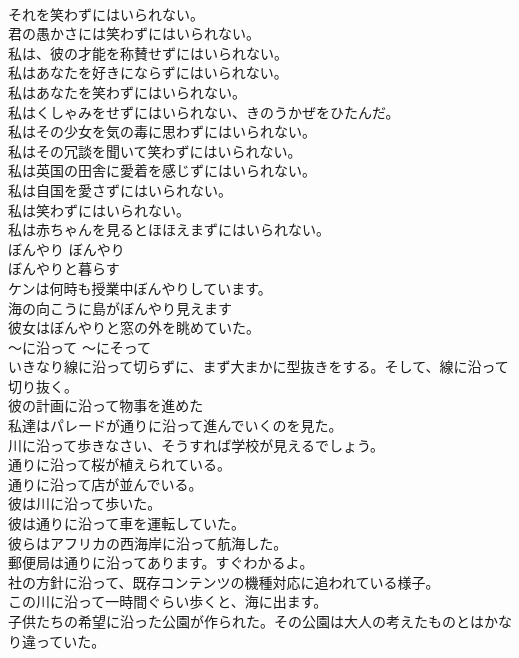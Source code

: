 \documentclass[8pt]{extreport}
\begin{document}
\begin{CJK}{UTF8}{min}
\\	それを笑わずにはいられない。  
\\	君の愚かさには笑わずにはいられない。   
\\	私は、彼の才能を称賛せずにはいられない。  
\\	私はあなたを好きにならずにはいられない。   
\\	私はあなたを笑わずにはいられない。   
\\	私はくしゃみをせずにはいられない、きのうかぜをひたんだ。   
\\	私はその少女を気の毒に思わずにはいられない。   
\\	私はその冗談を聞いて笑わずにはいられない。   
\\	私は英国の田舎に愛着を感じずにはいられない。   
\\	私は自国を愛さずにはいられない。   
\\	私は笑わずにはいられない。  
\\	私は赤ちゃんを見るとほほえまずにはいられない。   
\\	ぼんやり	ぼんやり	
\\	ぼんやりと暮らす	
\\	ケンは何時も授業中ぼんやりしています。   
\\	海の向こうに島がぼんやり見えます  
\\	彼女はぼんやりと窓の外を眺めていた。  
\\	〜に沿って	〜にそって	
\\	いきなり線に沿って切らずに、まず大まかに型抜きをする。そして、線に沿って切り抜く。  
\\	彼の計画に沿って物事を進めた  
\\	私達はパレードが通りに沿って進んでいくのを見た。   
\\	川に沿って歩きなさい、そうすれば学校が見えるでしょう。   
\\	通りに沿って桜が植えられている。   
\\	通りに沿って店が並んでいる。   
\\	彼は川に沿って歩いた。   
\\	彼は通りに沿って車を運転していた。   
\\	彼らはアフリカの西海岸に沿って航海した。   
\\	郵便局は通りに沿ってあります。すぐわかるよ。   
\\	社の方針に沿って、既存コンテンツの機種対応に追われている様子。   
\\	この川に沿って一時間ぐらい歩くと、海に出ます。   
\\	子供たちの希望に沿った公園が作られた。その公園は大人の考えたものとはかなり違っていた。   

\end{CJK}
\end{document}
